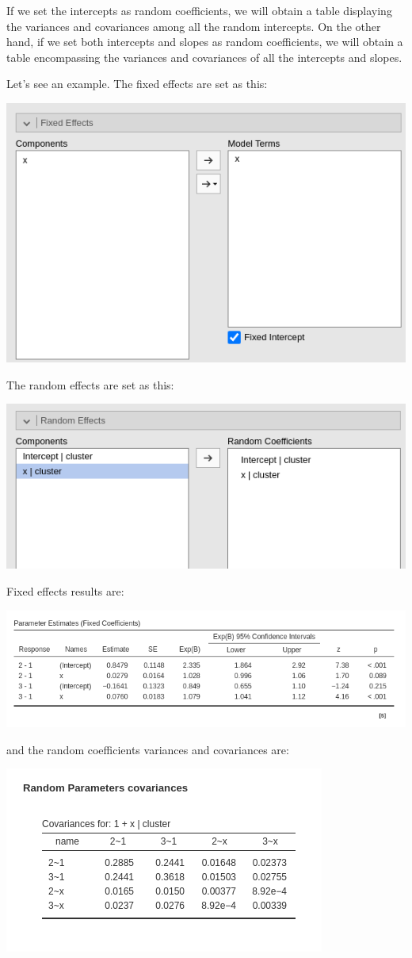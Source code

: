 \documentclass[
]{book}
\begin{document}
If we set the intercepts as random coefficients, we will obtain a table displaying the variances and covariances among all the random intercepts. On the other hand, if we set both intercepts and slopes as random coefficients, we will obtain a table encompassing the variances and covariances of all the intercepts and slopes.

Let's see an example. The fixed effects are set as this:

\includegraphics[width=0.7\linewidth]{bookletpics/5_multinomial_input1}

The random effects are set as this:

\includegraphics[width=0.7\linewidth]{bookletpics/5_multinomial_input2}

Fixed effects results are:

\includegraphics[width=0.9\linewidth]{bookletpics/5_multinomial_output1}

and the random coefficients variances and covariances are:

\includegraphics[width=0.5\linewidth]{bookletpics/5_multinomial_output2}
\end{document}
